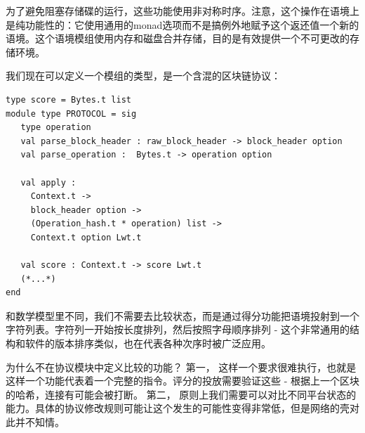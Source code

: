 \documentclass[letterpaper]{article}
\begin{document}
为了避免阻塞存储碟的运行，这些功能使用非对称时序。注意，这个操作在语境上是纯功能性的：它使用通用的monad选项而不是搞例外地赋予这个返还值一个新的语境。这个语境模组使用内存和磁盘合并存储，目的是有效提供一个不可更改的存储环境。

我们现在可以定义一个模组的类型，是一个含混的区块链协议：

\begin{lstlisting}
type score = Bytes.t list
module type PROTOCOL = sig
   type operation
   val parse_block_header : raw_block_header -> block_header option
   val parse_operation :  Bytes.t -> operation option

   val apply :
     Context.t ->
     block_header option ->
     (Operation_hash.t * operation) list ->
     Context.t option Lwt.t

   val score : Context.t -> score Lwt.t
   (*...*)
end
\end{lstlisting}

和数学模型里不同，我们不需要去比较状态，而是通过得分功能把语境投射到一个字符列表。字符列一开始按长度排列，然后按照字母顺序排列 - 这个非常通用的结构和软件的版本排序类似，也在代表各种次序时被广泛应用。

为什么不在协议模块中定义比较的功能？
第一，	这样一个要求很难执行，也就是这样一个功能代表着一个完整的指令。评分的投放需要验证这些 - 根据上一个区块的哈希，连接有可能会被打断。
第二，	原则上我们需要可以对比不同平台状态的能力。具体的协议修改规则可能让这个发生的可能性变得非常低，但是网络的壳对此并不知情。
\end{document}
